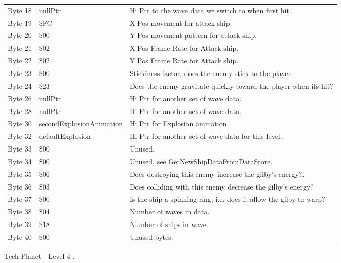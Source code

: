 \begin{figure}[H]
{\begin{adjustbox}{width=12cm}
\begin{tabular}{lll}
 Byte 18 & nullPtr                  & Hi Ptr to the wave data we switch to when first hit.               \\
 Byte 19 & \$FC                      & X Pos movement for attack ship.                                    \\
 Byte 20 & \$00                      & Y Pos movement pattern for attack ship.                            \\
 Byte 21 & \$02                      & X Pos Frame Rate for Attack ship.                                  \\
 Byte 22 & \$02                      & Y Pos Frame Rate for Attack ship.                                  \\
 Byte 23 & \$00                      & Stickiness factor, does the enemy stick to the player              \\
 Byte 24 & \$23                      & Does the enemy gravitate quickly toward the player when its hit?   \\
 Byte 26 & nullPtr                  & Hi Ptr for another set of wave data.                               \\
 Byte 28 & nullPtr                  & Hi Ptr for another set of wave data.                               \\
 Byte 30 & secondExplosionAnimation & Hi Ptr for Explosion animation.                                    \\
 Byte 32 & defaultExplosion         & Hi Ptr for another set of wave data for this level.                \\
 Byte 33 & \$00                      & Unused.                                                            \\
 Byte 34 & \$00                      & Unused, see GetNewShipDataFromDataStore.                           \\
 Byte 35 & \$06                      & Does destroying this enemy increase the gilby's energy?.           \\
 Byte 36 & \$03                      & Does colliding with this enemy decrease the gilby's energy?        \\
 Byte 37 & \$00                      & Is the ship a spinning ring, i.e. does it allow the gilby to warp? \\
 Byte 38 & \$04                      & Number of waves in data.                                           \\
 Byte 39 & \$18                      & Number of ships in wave.                                           \\
 Byte 40 & \$00                      & Unused bytes.                                                      \\
\bottomrule
\end{tabular}

  \end{adjustbox}

  }\caption*{Tech Planet - Level 4
.}
\end{figure}

